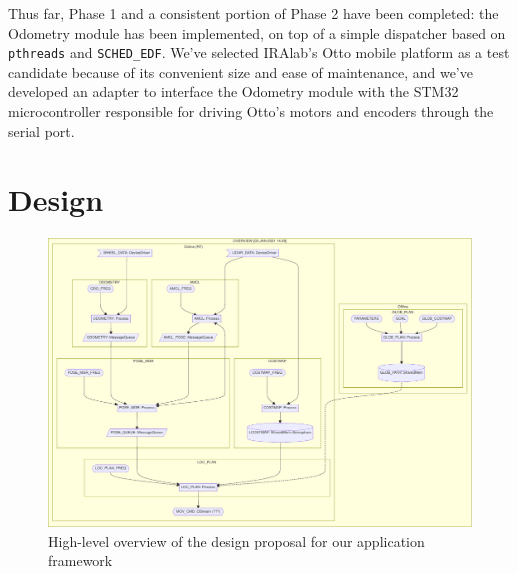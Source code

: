 \documentclass[a4paper,12pt]{report}
\begin{document}
Thus far, Phase 1 and a consistent portion of Phase 2 have been completed: the Odometry module has been implemented, on top of a simple dispatcher based on \texttt{pthreads} and \texttt{SCHED\_EDF}. We've selected IRAlab's Otto \cite{fdila-bs-otto} mobile platform as a test candidate because of its convenient size and ease of maintenance, and we've developed an adapter to interface the Odometry module with the STM32 microcontroller responsible for driving Otto's motors and encoders through the serial port.

\section{Design}

\begin{figure}[H]
    \centering
    \includegraphics[width=\textwidth]{img/overview.pdf}
    \caption{High-level overview of the design proposal for our application framework}
\end{figure}
\end{document}
